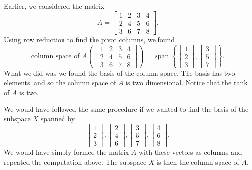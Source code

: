 \begin{example}
Earlier, we considered the matrix
\begin{equation*}
A =
\begin{bmatrix}
1 & 2 & 3 & 4 \\
2 & 4 & 5 & 6 \\
3 & 6 & 7 & 8
\end{bmatrix} .
\end{equation*}
Using row reduction to find the pivot columns, we found
\begin{equation*}
\text{column space of $A$} \left(
\begin{bmatrix}
1 & 2 & 3 & 4 \\
2 & 4 & 5 & 6 \\
3 & 6 & 7 & 8
\end{bmatrix} 
\right)
=
\operatorname{span}
\left\{
\begin{bmatrix}
1 \\
2 \\
3 
\end{bmatrix} 
,
\begin{bmatrix}
3 \\
5 \\
7 
\end{bmatrix} 
\right\} .
\end{equation*}
What we did was we found the basis of the column space.
The basis has two elements, and so the column space of $A$ is two dimensional.
Notice that the rank of $A$ is two.
\end{example}

We would have followed the same procedure if we wanted to find the basis of
the subspace $X$ spanned by
\begin{equation*}
\begin{bmatrix}
1 \\
2 \\
3 
\end{bmatrix} 
,
\begin{bmatrix}
2 \\
4 \\
6 
\end{bmatrix} 
,
\begin{bmatrix}
3 \\
5 \\
7 
\end{bmatrix} 
,
\begin{bmatrix}
4 \\
6 \\
8 
\end{bmatrix}
.
\end{equation*}
We would have simply formed the matrix $A$ with these vectors as columns
and repeated the computation above.  The subspace $X$ is then the column space of
$A$.

